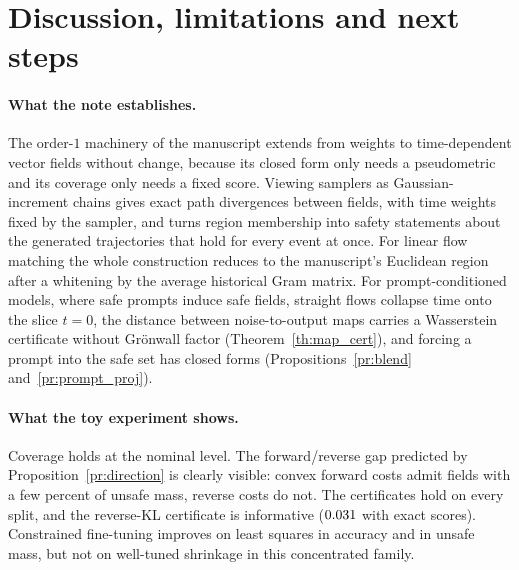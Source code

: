 \documentclass{article}
\theoremstyle{plain}
\begin{document}
\section{Discussion, limitations and next steps}\label{sec:discussion}

\paragraph{What the note establishes.}
The order-$1$ machinery of the manuscript extends from weights to time-dependent vector fields
without change, because its closed form only needs a pseudometric and its coverage only needs a
fixed score. Viewing samplers as Gaussian-increment chains gives exact path divergences between
fields, with time weights fixed by the sampler, and turns region membership into safety
statements about the generated trajectories that hold for every event at once. For
linear flow matching the whole construction reduces to the manuscript's Euclidean region after a
whitening by the average historical Gram matrix. For prompt-conditioned models, where safe prompts
induce safe fields, straight flows collapse time onto the slice $t=0$, the distance between
noise-to-output maps carries a Wasserstein certificate without Gr\"onwall factor
(Theorem~\ref{th:map_cert}), and forcing a prompt into the safe set has closed forms
(Propositions~\ref{pr:blend} and~\ref{pr:prompt_proj}).

\paragraph{What the toy experiment shows.}
Coverage holds at the nominal level. The forward/reverse gap predicted by
Proposition~\ref{pr:direction} is clearly visible: convex forward costs admit fields with a few
percent of unsafe mass, reverse costs do not. The certificates hold on every split, and the
reverse-KL certificate is informative ($0.031$ with exact scores). Constrained fine-tuning
improves on least squares in accuracy and in unsafe mass, but not on well-tuned shrinkage in this
concentrated family.
\end{document}

